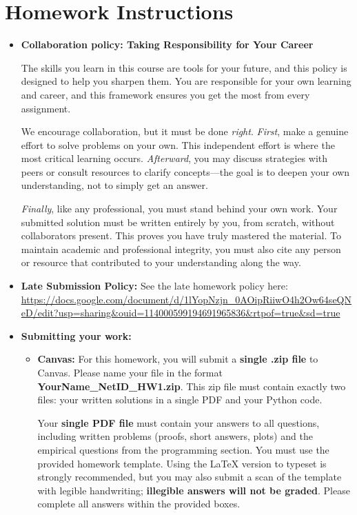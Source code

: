 \documentclass{article}
\begin{document}
\section*{Homework Instructions}
\begin{itemize}
\item \textbf{Collaboration policy: Taking Responsibility for Your Career} 

The skills you learn in this course are tools for your future, and this policy is designed to help you sharpen them. You are responsible for your own learning and career, and this framework ensures you get the most from every assignment.

We encourage collaboration, but it must be done \emph{right}. \emph{First}, make a genuine effort to solve problems on your own. This independent effort is where the most critical learning occurs. \emph{Afterward}, you may discuss strategies with peers or consult resources to clarify concepts—the goal is to deepen your own understanding, not to simply get an answer.

\emph{Finally}, like any professional, you must stand behind your own work. Your submitted solution must be written entirely by you, from scratch, without collaborators present. This proves you have truly mastered the material. To maintain academic and professional integrity, you must also cite any person or resource that contributed to your understanding along the way. 

\item\textbf{Late Submission Policy:} See the late homework policy here: \url{https://docs.google.com/document/d/1lYopNzjn_0AOipRiiwO4h2Ow64seQNeD/edit?usp=sharing&ouid=114000599194691965836&rtpof=true&sd=true}

\item\textbf{Submitting your work:} 

\begin{itemize}

\item \textbf{Canvas:} 
For this homework, you will submit a \textbf{single .zip file} to Canvas. Please name your file in the format \textbf{YourName\_NetID\_HW1.zip}. This zip file must contain exactly two files: your written solutions in a single PDF and your Python code.

Your \textbf{single PDF file} must contain your answers to all questions, including written problems (proofs, short answers, plots) and the empirical questions from the programming section. You must use the provided homework template. Using the LaTeX version to typeset is strongly recommended, but you may also submit a scan of the template with legible handwriting; \textbf{illegible answers will not be graded}. Please complete all answers within the provided boxes. 


\end{itemize}
\end{itemize}
\end{document}
